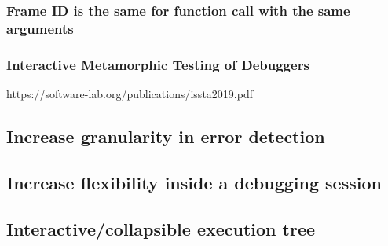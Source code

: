 \subsubsection{Frame ID is the same for function call with the same arguments}
\subsubsection{Interactive Metamorphic Testing of Debuggers}
https://software-lab.org/publications/issta2019.pdf
\subsection{Increase granularity in error detection}
\subsection{Increase flexibility inside a debugging session}
\subsection{Interactive/collapsible execution tree}